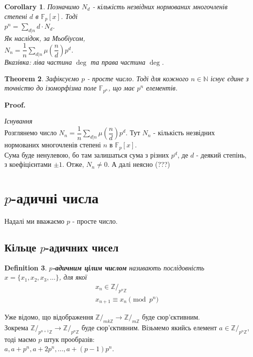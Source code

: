 \documentclass[a4paper, 10pt]{article}
\makeatletter
\theoremstyle{theoremdd}
\newtheorem{theorem}{Theorem}[subsection]
\theoremstyle{theoremdd}
\newtheorem{definition}[theorem]{Definition}
\theoremstyle{theoremdd}
\theoremstyle{theoremdd}
\theoremstyle{theoremdd}
\theoremstyle{theoremdd}
\theoremstyle{theoremdd}
\theoremstyle{theoremdd}
\newtheorem{corollary}[theorem]{Corollary}
\renewenvironment{proof}[1][Proof.\\]{\par
\pushQED{\hfill \qed}%
\normalfont \topsep6\p@\@plus6\p@\relax
\trivlist
\item\relax
{\bfseries
#1\@addpunct{.}}\hspace\labelsep\ignorespaces
}{%
\popQED\endtrivlist\@endpefalse
}
\makeatother
\begin{document}
\begin{corollary}
Позначимо $N_d$ - кількість незвідних нормованих многочленів степені $d$ в $\mathbb{F}_p[x]$. Тоді\\
$p^n = \displaystyle\sum_{d | n} d \cdot N_d$.\\
Як наслідок, за Мьобіусом,\\
$N_n = \dfrac{1}{n} \displaystyle\sum_{d | n} \mu\left( \dfrac{n}{d} \right) p^d$.\\
\textit{Вказівка: ліва частина $\deg$ та права частина $\deg$.}
\end{corollary}

\begin{theorem}
Зафіксуємо $p$ - просте число. Тоді для кожного $n \in \mathbb{N}$ існує єдине з точністю до ізоморфізма поле $\mathbb{F}_{p^n}$, що має $p^n$ елементів.
\end{theorem}

\begin{proof}
\textit{Існування}\\
Розглянемо число $N_n = \dfrac{1}{n} \displaystyle\sum_{d | n} \mu\left( \dfrac{n}{d} \right) p^d$. Тут $N_n$ - кількість незвідних нормованих многочленів степені $n$ в $\mathbb{F}_p[x]$.\\
Сума буде ненулевою, бо там залишаться сума з різних $p^d$, де $d$ - деякий степінь, з коефіцієнтами $\pm 1$. Отже, $N_n \neq 0$. А далі неясно (???)
\end{proof}
\newpage

\section{$p$-адичні числа}
Надалі ми вважаємо $p$ - просте число.
\subsection{Кільце $p$-адичних чисел}
\begin{definition}
\textbf{$p$-адичним цілим числом} називають послідовність $x = \{x_1,x_2,x_3,\dots\}$, для якої
\begin{align*}
x_n \in \mathbb{Z}/_{p^n \mathbb{Z}} \\
x_{n+1} \equiv x_n \pmod {p^n}
\end{align*}
\end{definition}
Уже відомо, що відображення $\mathbb{Z}/_{mk \mathbb{Z}} \to \mathbb{Z}/_{m \mathbb{Z}}$ буде сюр'єктивним.\\
Зокрема $\mathbb{Z}/_{p^{n+1} \mathbb{Z}} \to \mathbb{Z}/_{p^n \mathbb{Z}}$ буде сюр'єктивним. Візьмемо якийсь елемент $a \in \mathbb{Z}/_{p^n \mathbb{Z}}$, тоді маємо $p$ штук прообразів:\\
$a, a+p^n, a+2p^n, \dots, a+(p-1)p^n$.
\end{document}
